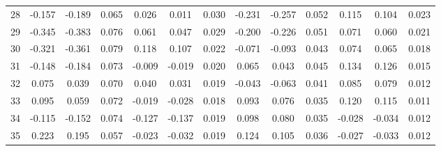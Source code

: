 {\begin{footnotesize}
\begin{longtable}{lcccccccccccc}
28 & -0.157 & -0.189 & 0.065 & 0.026 & 0.011 & 0.030 & -0.231 & -0.257 & 0.052 & 0.115 & 0.104 & 0.023 \\
29 & -0.345 & -0.383 & 0.076 & 0.061 & 0.047 & 0.029 & -0.200 & -0.226 & 0.051 & 0.071 & 0.060 & 0.021 \\
30 & -0.321 & -0.361 & 0.079 & 0.118 & 0.107 & 0.022 & -0.071 & -0.093 & 0.043 & 0.074 & 0.065 & 0.018 \\
31 & -0.148 & -0.184 & 0.073 & -0.009 & -0.019 & 0.020 & 0.065 & 0.043 & 0.045 & 0.134 & 0.126 & 0.015 \\
32 & 0.075 & 0.039 & 0.070 & 0.040 & 0.031 & 0.019 & -0.043 & -0.063 & 0.041 & 0.085 & 0.079 & 0.012 \\
33 & 0.095 & 0.059 & 0.072 & -0.019 & -0.028 & 0.018 & 0.093 & 0.076 & 0.035 & 0.120 & 0.115 & 0.011 \\
34 & -0.115 & -0.152 & 0.074 & -0.127 & -0.137 & 0.019 & 0.098 & 0.080 & 0.035 & -0.028 & -0.034 & 0.012 \\
35 & 0.223 & 0.195 & 0.057 & -0.023 & -0.032 & 0.019 & 0.124 & 0.105 & 0.036 & -0.027 & -0.033 & 0.012 \\
\end{longtable}
\end{footnotesize}

}
